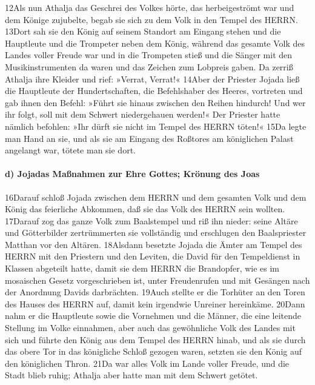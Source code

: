 12Als nun Athalja das Geschrei des Volkes hörte, das herbeigeströmt war
und dem Könige zujubelte, begab sie sich zu dem Volk in den Tempel des
HERRN. 13Dort sah sie den König auf seinem Standort am Eingang stehen
und die Hauptleute und die Trompeter neben dem König, während das
gesamte Volk des Landes voller Freude war und in die Trompeten stieß und
die Sänger mit den Musikinstrumenten da waren und das Zeichen zum
Lobpreis gaben. Da zerriß Athalja ihre Kleider und rief: »Verrat,
Verrat!« 14Aber der Priester Jojada ließ die Hauptleute der
Hundertschaften, die Befehlshaber des Heeres, vortreten und gab ihnen
den Befehl: »Führt sie hinaus zwischen den Reihen hindurch! Und wer ihr
folgt, soll mit dem Schwert niedergehauen werden!« Der Priester hatte
nämlich befohlen: »Ihr dürft sie nicht im Tempel des HERRN töten!« 15Da
legte man Hand an sie, und als sie am Eingang des Roßtores am
königlichen Palast angelangt war, tötete man sie dort.

\hypertarget{d-jojadas-mauxdfnahmen-zur-ehre-gottes-kruxf6nung-des-joas}{%
\paragraph{d) Jojadas Maßnahmen zur Ehre Gottes; Krönung des
Joas}\label{d-jojadas-mauxdfnahmen-zur-ehre-gottes-kruxf6nung-des-joas}}

16Darauf schloß Jojada zwischen dem HERRN und dem gesamten Volk und dem
König das feierliche Abkommen, daß sie das Volk des HERRN sein wollten.
17Darauf zog das ganze Volk zum Baalstempel und riß ihn nieder: seine
Altäre und Götterbilder zertrümmerten sie vollständig und erschlugen den
Baalspriester Matthan vor den Altären. 18Alsdann besetzte Jojada die
Ämter am Tempel des HERRN mit den Priestern und den Leviten, die David
für den Tempeldienst in Klassen abgeteilt hatte, damit sie dem HERRN die
Brandopfer, wie es im mosaischen Gesetz vorgeschrieben ist, unter
Freudenrufen und mit Gesängen nach der Anordnung Davids darbrächten.
19Auch stellte er die Torhüter an den Toren des Hauses des HERRN auf,
damit kein irgendwie Unreiner hereinkäme. 20Dann nahm er die Hauptleute
sowie die Vornehmen und die Männer, die eine leitende Stellung im Volke
einnahmen, aber auch das gewöhnliche Volk des Landes mit sich und führte
den König aus dem Tempel des HERRN hinab, und als sie durch das obere
Tor in das königliche Schloß gezogen waren, setzten sie den König auf
den königlichen Thron. 21Da war alles Volk im Lande voller Freude, und
die Stadt blieb ruhig; Athalja aber hatte man mit dem Schwert getötet.


